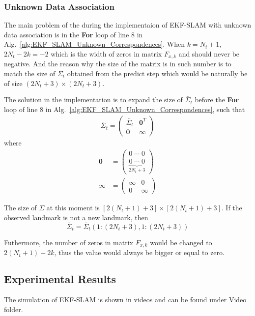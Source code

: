 \documentclass[conference]{IEEEtran}
\begin{document}
\subsubsection{Unknown Data Association}
\par The main problem of the during the implementaion of EKF-SLAM with unknown data association is in the \textbf{For} loop of line 8 in Alg.~\ref{alg:EKF_SLAM_Unknown_Correspondences}. When $k=N_{t}+1$, $2N_{t}-2k=-2$ which is the width of zeros in matrix $F_{x,k}$ and should never be negative. And the reason why the size of the matrix is in such number is to match the size of $\bar{\Sigma}_{t}$ obtained from the predict step which would be naturally be of size $(2N_{t}+3)\times(2N_{t}+3)$.
\par The solution in the implementation is to expand the size of $\bar{\Sigma}_{t}$ before the \textbf{For} loop of line 8 in Alg.~\ref{alg:EKF_SLAM_Unknown_Correspondences}, such that
	\begin{align*}
		\bar{\Sigma}_{t} = \begin{pmatrix} \bar{\Sigma}_{t} & \mathbf{0}^{T} \\ \mathbf{0} & \bm{\infty} \end{pmatrix}
	\end{align*}
where
	\begin{align*}
		\mathbf{0} & = \begin{pmatrix} 0 \; \cdots \; 0 \\ \underbrace{0 \; \cdots \; 0}_{2N_{t}+3} \end{pmatrix} \\
		\bm{\infty} & = \begin{pmatrix} \infty & 0 \\ 0 & \infty \end{pmatrix}
	\end{align*}
\par The size of $\Sigma$ at this moment is $[2(N_{t}+1)+3]\times[2(N_{t}+1)+3]$. If the observed landmark is not a new landmark, then
	$$ \bar{\Sigma}_{t} = \bar{\Sigma}_{t}\left( 1:(2N_{t}+3), 1:(2N_{t}+3) \right)$$
\par Futhermore, the number of zeros in matrix $F_{x,k}$ would be changed to $2(N_{t}+1)-2k$, thus the value would always be bigger or equal to zero.
% 
\subsection{Experimental Results}
\par The simulation of EKF-SLAM is shown in videos and can be found under Video folder.
\end{document}
